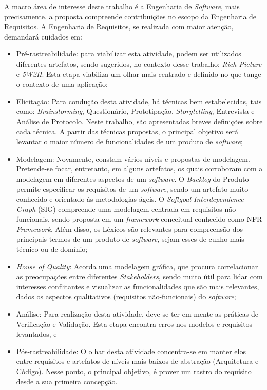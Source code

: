 A macro área de interesse deste trabalho é a Engenharia de \textit{Software}, mais precisamente, a proposta compreende contribuições no escopo da Engenharia de Requisitos. A Engenharia de Requisitos, se realizada com maior atenção, demandará cuidados em:

\begin{itemize}
    \item Pré-rastreabilidade: para viabilizar esta atividade, podem ser utilizados diferentes artefatos, sendo sugeridos, no contexto desse trabalho: \textit{Rich Picture} e \textit{5W2H}. Esta etapa viabiliza um olhar mais centrado e definido no que tange o contexto de uma aplicação;
    \item Elicitação: Para condução desta atividade, há técnicas bem estabelecidas, tais como: \textit{Brainstorming}, Questionário, Prototipação, \textit{Storytelling}, Entrevista e Análise de Protocolo. Neste trabalho, são apresentadas breves definições sobre cada técnica. A partir das técnicas propostas, o principal objetivo será levantar o maior número de funcionalidades de um produto de \textit{software};
    \item Modelagem: Novamente, constam vários níveis e propostas de modelagem. Pretende-se focar, entretanto, em alguns artefatos, os quais corroboram com a modelagem em diferentes aspectos de um \textit{software}. O \textit{Backlog} do Produto permite especificar os requisitos de um \textit{software}, sendo um artefato muito conhecido e orientado às metodologias ágeis. O \textit{Softgoal Interdependence Graph} (SIG) compreende uma modelagem centrada em requisitos não funcionais, sendo proposta em um \textit{framework} conceitual conhecido como NFR \textit{Framework}. Além disso, os Léxicos são relevantes para compreensão dos principais termos de um produto de \textit{software}, sejam esses de cunho mais técnico ou de domínio;
    \item \textit{House of Quality}: Acorda uma modelagem gráfica, que procura correlacionar as preocupações entre diferentes \textit{Stakeholders}, sendo muito útil para lidar com interesses conflitantes e visualizar as funcionalidades que são mais relevantes, dados os aspectos qualitativos (requisitos não-funcionais) do \textit{software};
    \item Análise: Para realização desta atividade, deve-se ter em mente as práticas de Verificação e Validação. Esta etapa encontra erros nos modelos e requisitos levantados, e
    \item Pós-rastreabilidade: O olhar desta atividade concentra-se em manter elos entre requisitos e artefatos de níveis mais baixos de abstração (Arquitetura e Código). Nesse ponto, o principal objetivo, é prover um rastro do requisito desde a sua primeira concepção.
\end{itemize}

